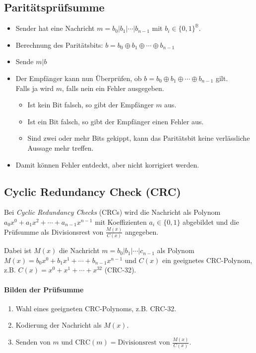         \subsection{Paritätsprüfsumme}
            \begin{itemize}
            	\item Sender hat eine Nachricht \( m = b_0 \vert b_1 \vert \cdots \vert b_{n - 1} \) mit \( b_i \in \{0,1\}^\mathbb{B} \).
            	\item Berechnung des Paritätsbits: \( b = b_0 \oplus b_1 \oplus \cdots \oplus b_{n-1} \)
            	\item Sende \( m \vert b \)
            	\item Der Empfänger kann nun Überprüfen, ob \( b = b_0 \oplus b_1 \oplus \cdots \oplus b_{n-1} \) gilt. \\ Falls ja wird \(m\), falls nein ein Fehler ausgegeben.
	            	\begin{itemize}
		            	\item Ist kein Bit falsch, so gibt der Empfänger \(m\) aus.
		            	\item Ist ein Bit falsch, so gibt der Empfänger einen Fehler aus.
		            	\item Sind zwei oder mehr Bits gekippt, kann das Paritätsbit keine verlässliche Aussage mehr treffen.
	            	\end{itemize}
            	\item Damit können Fehler entdeckt, aber nicht korrigiert werden.
            \end{itemize}

        \subsection{Cyclic Redundancy Check (CRC)}
            Bei \textit{Cyclic Redundancy Checks} (CRCs)  wird die Nachricht als Polynom \( a_0x^0 + a_1x^2 + \cdots + a_{n-1}x^{n-1} \) mit Koeffizienten \( a_i \in \{0,1\} \) abgebildet und die Prüfsumme als Divisionsrest von \( \frac{M(x)}{C(x)} \) angegeben.
            
            Dabei ist \( M(x) \) die Nachricht \( m = b_0 \vert b_1 \vert \cdots \vert c_{n-1} \) als Polynom \( M(x) = b_0x^0 + b_1x^1 + \cdots + b_{n-1}x^{n-1} \) und \(C(x)\) ein geeignetes CRC-Polynom, z.B. \( C(x) = x^0 + x^1 + \cdots + x^32 \) (CRC-32).
            
            \paragraph{Bilden der Prüfsumme}
                \begin{enumerate}
                	\item Wahl eines geeigneten CRC-Polynoms, z.B. CRC-32.
                	\item Kodierung der Nachricht als \( M(x) \).
                	\item Senden von \(m\) und \( \textrm{CRC}(m) = \textrm{Divisionsrest von } \frac{M(x)}{C(x)} \).
                \end{enumerate}
            
